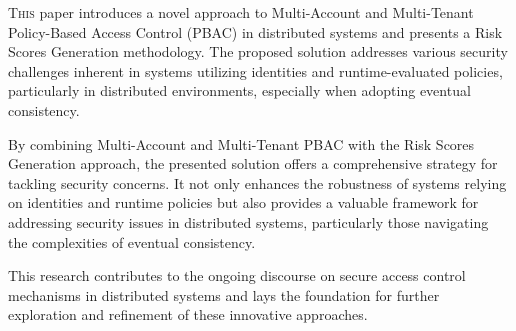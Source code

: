 \lettrine{T}{his} paper introduces a novel approach to Multi-Account and Multi-Tenant Policy-Based Access Control (PBAC) in distributed systems and presents a Risk Scores Generation methodology. 
The proposed solution addresses various security challenges inherent in systems utilizing identities and runtime-evaluated policies, particularly in distributed environments, especially when adopting eventual consistency.

By combining Multi-Account and Multi-Tenant PBAC with the Risk Scores Generation approach, the presented solution offers a comprehensive strategy for tackling security concerns. 
It not only enhances the robustness of systems relying on identities and runtime policies but also provides a valuable framework for addressing security issues in distributed systems, particularly those navigating the complexities of eventual consistency.

This research contributes to the ongoing discourse on secure access control mechanisms in distributed systems and lays the foundation for further exploration and refinement of these innovative approaches.
